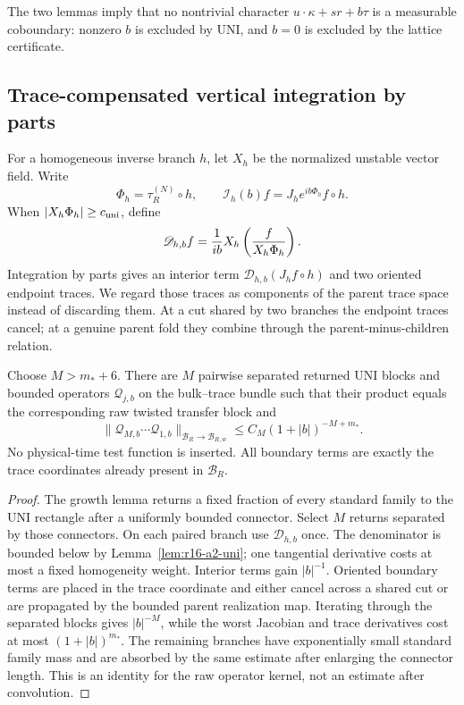 The two lemmas imply that no nontrivial character
\(u\cdot\kappa+sr+b\tau\) is a measurable coboundary: nonzero \(b\) is
excluded by UNI, and \(b=0\) is excluded by the lattice certificate.

\subsection{Trace-compensated vertical integration by parts}

For a homogeneous inverse branch \(h\), let \(X_h\) be the normalized unstable
vector field.  Write
\[
 \Phi_h=\tau_R^{(N)}\circ h,
 \qquad
 \mathscr I_h(b)f=J_h e^{ib\Phi_h}f\circ h.
\]
When \(|X_h\Phi_h|\ge c_{\rm uni}\), define
\[
 \mathscr D_{h,b}f
 ={1\over ib}X_h\left({f\over X_h\Phi_h}\right).
\]
Integration by parts gives an interior term \(\mathscr D_{h,b}
(J_hf\circ h)\) and two oriented endpoint traces.  We regard those traces as
components of the parent trace space instead of discarding them.  At a cut
shared by two branches the endpoint traces cancel; at a genuine parent fold
they combine through the parent-minus-children relation.

\begin{lemma}
\label{lem:r16-a2-rawblock}
Choose \(M>m_*+6\).  There are \(M\) pairwise separated returned UNI blocks
and bounded operators \(\mathscr Q_{j,b}\) on the bulk--trace bundle such
that their product equals the corresponding raw twisted transfer block and
\[
 \|\mathscr Q_{M,b}\cdots\mathscr Q_{1,b}\|_{
    \mathcal B_R\to\mathcal B_{R,w}}
 \le C_M(1+|b|)^{-M+m_*}.
\]
No physical-time test function is inserted.  All boundary terms are exactly
the trace coordinates already present in \(\mathcal B_R\).
\end{lemma}

\begin{proof}
The growth lemma returns a fixed fraction of every standard family to the UNI
rectangle after a uniformly bounded connector.  Select \(M\) returns
separated by those connectors.  On each paired branch use \(\mathscr D_{h,b}\)
once.  The denominator is bounded below by Lemma~\ref{lem:r16-a2-uni}; one
tangential derivative costs at most a fixed homogeneity weight.  Interior
terms gain \(|b|^{-1}\).  Oriented boundary terms are placed in the trace
coordinate and either cancel across a shared cut or are propagated by the
bounded parent realization map.  Iterating through the separated blocks gives
\(|b|^{-M}\), while the worst Jacobian and trace derivatives cost at most
\((1+|b|)^{m_*}\).  The remaining branches have exponentially small standard
family mass and are absorbed by the same estimate after enlarging the
connector length.  This is an identity for the raw operator kernel, not an
estimate after convolution.
\end{proof}

